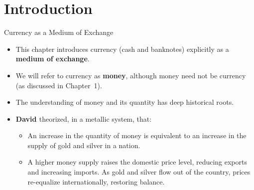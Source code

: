 \documentclass[11pt,aspectratio=169]{beamer}
\begin{document}
\section{Introduction}
\begin{frame}{Currency as a Medium of Exchange}
\small
\begin{itemize}

    \item This chapter introduces currency (cash and banknotes) explicitly as a \textbf{medium of exchange}.

    \vspace{0.6em}

    \item We will refer to currency as \textbf{money}, although money need not be currency (as discussed in Chapter~1).

    \vspace{0.6em}

    \item The understanding of money and its quantity has deep historical roots.

    \vspace{0.8em}

    \item \textbf{David \textcite{hume1752money}} theorized, in a metallic system, that:
    \begin{itemize}
        \item An increase in the quantity of money is equivalent to an increase in the supply of gold and silver in a nation.
        \item A higher money supply raises the domestic price level, reducing exports and increasing imports.  
              As gold and silver flow out of the country, prices re-equalize internationally, restoring balance.
    \end{itemize}

\end{itemize}
\end{frame}
\end{document}
